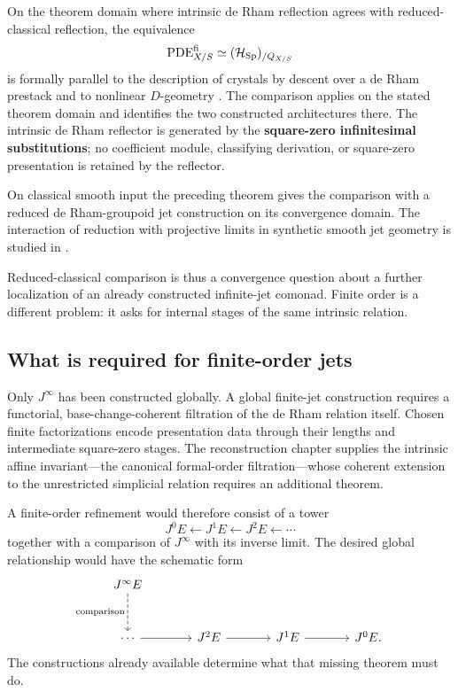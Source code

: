 \begin{remark}
On the theorem domain where intrinsic de Rham reflection agrees with
reduced-classical reflection, the equivalence
\[
  \operatorname{PDE}^{\mathrm{fi}}_{X/S}
  \simeq
  (\mathcal H_{\operatorname{Sp}})_{/Q_{X/S}}
\]
is formally parallel to the description of crystals by descent over a de Rham
prestack and to nonlinear \(D\)-geometry
\cite{GaitsgoryRozenblyumCrystals,BeilinsonDrinfeld2004}. The comparison applies on the stated theorem domain and identifies the two
constructed architectures there. The intrinsic de Rham reflector is generated by the
\textbf{square-zero infinitesimal substitutions}; no
coefficient module, classifying derivation, or square-zero presentation is
retained by the reflector.
\end{remark}

\begin{remark}
On classical smooth input the preceding theorem gives the comparison with a
reduced de Rham-groupoid jet construction on its convergence domain. The
interaction of reduction with projective limits in synthetic smooth jet geometry
is studied in
\cite{GiotopoulosKhavkineSatiSchreiberReducedJets}.
\end{remark}

Reduced-classical comparison is thus a convergence question about a further
localization of an already constructed infinite-jet comonad. Finite order is a
different problem: it asks for internal stages of the same intrinsic relation.

\subsection{What is required for finite-order jets}
\label{sec:no-finite-order-jets}

Only \(J^\infty\) has been constructed globally. A global finite-jet construction
requires a functorial, base-change-coherent filtration of the de Rham relation
itself. Chosen finite factorizations encode presentation data through their
lengths and intermediate square-zero stages. The reconstruction chapter
supplies the intrinsic affine invariant---the canonical formal-order
filtration---whose coherent extension to the unrestricted simplicial relation
requires an additional theorem.

A finite-order refinement would therefore consist of a tower
\[
  J^0E\longleftarrow J^1E\longleftarrow J^2E\longleftarrow\cdots
\]
together with a comparison of \(J^\infty\) with its inverse limit. The desired
global relationship would have the schematic form
\[
\begin{tikzcd}[column sep=large,row sep=large]
J^\infty E \ar[d,dashed,"\text{comparison}"']\\
\cdots \ar[r]
& J^2E \ar[r]
& J^1E \ar[r]
& J^0E .
\end{tikzcd}
\]
The constructions already available determine what that missing theorem must
do.

